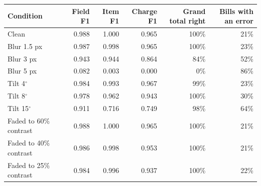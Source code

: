 \begin{tabular}{@{}lrrrrr@{}}
\toprule
Condition & Field F1 & Item F1 & Charge F1 & Grand total right & Bills with an error \\
\midrule
Clean & 0.988 & 1.000 & 0.965 & 100\% & 21\% \\
Blur 1.5 px & 0.987 & 0.998 & 0.965 & 100\% & 23\% \\
Blur 3 px & 0.943 & 0.944 & 0.864 & 84\% & 52\% \\
Blur 5 px & 0.082 & 0.003 & 0.000 & 0\% & 86\% \\
Tilt 4$^\circ$ & 0.984 & 0.993 & 0.967 & 99\% & 23\% \\
Tilt 8$^\circ$ & 0.978 & 0.962 & 0.943 & 100\% & 30\% \\
Tilt 15$^\circ$ & 0.911 & 0.716 & 0.749 & 98\% & 64\% \\
Faded to 60\% contrast & 0.988 & 1.000 & 0.965 & 100\% & 21\% \\
Faded to 40\% contrast & 0.986 & 0.998 & 0.953 & 100\% & 21\% \\
Faded to 25\% contrast & 0.984 & 0.996 & 0.937 & 100\% & 22\% \\
\bottomrule
\end{tabular}
